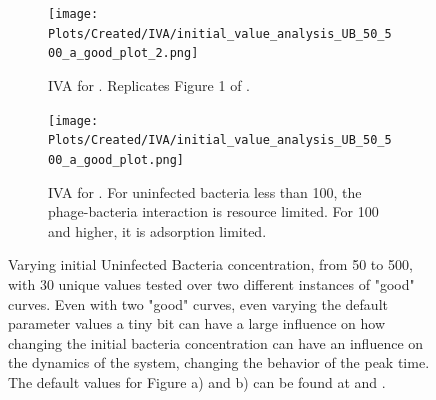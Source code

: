 \begin{figure}
    \centering
    \begin{subfigure}{1\linewidth}
        \centering
        \texttt{[image: Plots/Created/IVA/initial\_value\_analysis\_UB\_50\_500\_a\_good\_plot\_2.png]}
        \caption{
            IVA for . 
            Replicates Figure 1 of \citet{mullaExtremeDiversityPhage2024}. 
        }
        \label{fig:created:initial_value_analysis_UB_50_500_a_good_plot_2}
    \end{subfigure}
    \hfill
    \begin{subfigure}{1\linewidth}
        \centering
        \texttt{[image: Plots/Created/IVA/initial\_value\_analysis\_UB\_50\_500\_a\_good\_plot.png]}
        \caption{
            IVA for . 
            For uninfected bacteria less than 100, the phage-bacteria interaction is resource limited. 
            For 100 and higher, it is adsorption limited. 
        }
        \label{fig:created:initial_value_analysis_UB_50_500_a_good_plot}
    \end{subfigure}
    \caption{
        Varying initial Uninfected Bacteria concentration, from 50 to 500, with 30 unique values tested over two different instances of "good" curves. 
        Even with two "good" curves, even varying the default parameter values a tiny bit can have a large influence on how changing the initial bacteria concentration can have an influence on the dynamics of the system, changing the behavior of the peak time. 
        The default values for Figure a) and b) can be found at  and . 
    }
\end{figure}


